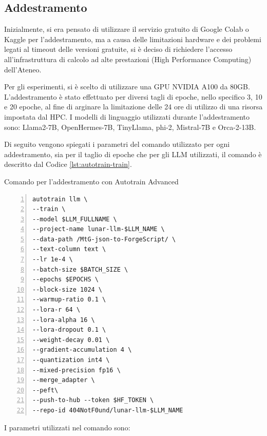 \subsection{Addestramento}\label{sec:hpc_unipr_autotrain}

Inizialmente, si era pensato di utilizzare il servizio gratuito di Google Colab o Kaggle per l'addestramento, ma a causa delle limitazioni hardware e dei problemi legati al timeout delle versioni gratuite, si è deciso di richiedere l'accesso all'infrastruttura di calcolo ad alte prestazioni (High Performance Computing) dell'Ateneo.

Per gli esperimenti, si è scelto di utilizzare una GPU NVIDIA A100 da 80GB. L'addestramento è stato effettuato per diversi tagli di epoche, nello specifico 3, 10 e 20 epoche, al fine di arginare la limitazione delle 24 ore di utilizzo di una risorsa impostata dal HPC. I modelli di linguaggio utilizzati durante l'addestramento sono: Llama2-7B, OpenHermes-7B, TinyLlama, phi-2, Mistral-7B e Orca-2-13B.

Di seguito vengono spiegati i parametri del comando utilizzato per ogni addestramento, sia per il taglio di epoche che per gli LLM utilizzati, il comando è descritto dal Codice \ref{lst:autotrain-train}.\newline\newline

\begin{algorithm}[ht]
	\caption{Comando per l'addestramento con Autotrain Advanced}
	\label{lst:autotrain-train}
 \scriptsize
	\begin{Verbatim}[numbers=left,breaklines]
autotrain llm \
--train \
--model $LLM_FULLNAME \
--project-name lunar-llm-$LLM_NAME \
--data-path /MtG-json-to-ForgeScript/ \
--text-column text \
--lr 1e-4 \
--batch-size $BATCH_SIZE \
--epochs $EPOCHS \
--block-size 1024 \
--warmup-ratio 0.1 \
--lora-r 64 \
--lora-alpha 16 \
--lora-dropout 0.1 \
--weight-decay 0.01 \
--gradient-accumulation 4 \
--quantization int4 \
--mixed-precision fp16 \
--merge_adapter \
--peft\
--push-to-hub --token $HF_TOKEN \
--repo-id 404NotF0und/lunar-llm-$LLM_NAME
	\end{Verbatim}
\end{algorithm}
 
 I parametri utilizzati nel comando sono:

